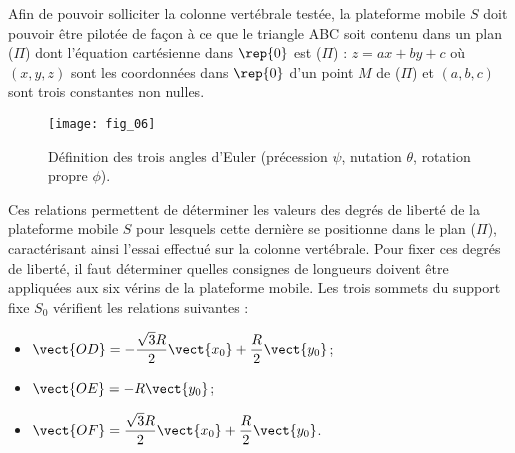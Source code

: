 Afin de pouvoir solliciter la colonne vertébrale testée, la plateforme mobile $S$ doit pouvoir être pilotée de façon à
ce que le triangle ABC soit contenu dans un plan ($\Pi$) dont l’équation cartésienne dans $\rep{0}$ est ($\Pi$) : $z=ax+by+c$
où $\left(x,y,z\right)$ sont les coordonnées dans $\rep{0}$ d’un point $M$ de ($\Pi$) et $(a,b,c)$ sont trois constantes non nulles.

\begin{figure}[H]
\centering
\texttt{[image: fig\_06]}
\caption{\label{fig:06} Définition des trois angles d’Euler (précession $\psi$, nutation $\theta$, rotation propre $\phi$).}
\end{figure}


\ifprof
\begin{corrige}
\end{corrige}
\else
\fi


Ces relations permettent de déterminer les valeurs des degrés de liberté de la plateforme mobile $S$ pour lesquels
cette dernière se positionne dans le plan ($\Pi$), caractérisant ainsi l’essai effectué sur la colonne vertébrale. Pour
fixer ces degrés de liberté, il faut déterminer quelles consignes de longueurs doivent être appliquées aux six
vérins de la plateforme mobile.
Les trois sommets du support fixe $S_0$ vérifient les relations suivantes :
\begin{itemize}
\item $\vect{OD}=-\dfrac{\sqrt{3}R}{2}\vect{x_0}+\dfrac{R}{2}\vect{y_0}$;
\item $\vect{OE}=-R\vect{y_0}$;
\item $\vect{OF}=\dfrac{\sqrt{3}R}{2}\vect{x_0}+\dfrac{R}{2}\vect{y_0}$.
\end{itemize}


